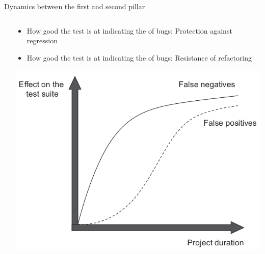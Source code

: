 \documentclass[english,handout,10pt,aspectratio=169,t]{beamer}
\begin{document}
\begin{frame}{Dynamics between the first and second pillar}
\begin{columns}[T]
\begin{column}[]{0.55\textwidth}
\begin{minipage}{\linewidth}
        \endgroup
      \end{minipage}
    \end{column}
    \begin{column}[]{0.45\textwidth}
      \begin{itemize}
        \item How good the test is at indicating the  of bugs: Protection against regression
        \item How good the test is at indicating the  of bugs: Resistance of refactoring
      \end{itemize}
      \includegraphics[width=\textwidth]{images/test_suite_fnfp.png}
    \end{column}
  \end{columns}
\end{frame}
\end{document}
